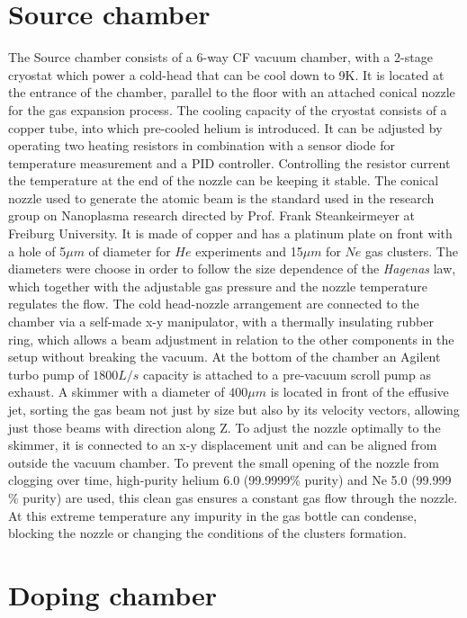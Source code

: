 \section{Source chamber}

The Source chamber consists of a 6-way CF vacuum chamber, with a 2-stage cryostat which power a cold-head that can be cool down to 9K. It is located at the entrance of the chamber, parallel to the floor with an attached conical nozzle for the gas expansion process. The cooling capacity of the cryostat consists of a copper tube, into which pre-cooled helium is introduced. It can be adjusted by operating two heating resistors in combination with a sensor diode for temperature measurement and a PID controller. Controlling the resistor current the temperature at the end of the nozzle can be keeping it stable. The conical nozzle used to generate the atomic beam is the standard used in the research group on Nanoplasma research directed by Prof. Frank Steankeirmeyer at Freiburg University.  It is made of copper and has a platinum plate on front with a hole of 5$\mu m$ of diameter for $He$ experiments and 15$\mu m$ for $Ne$ gas clusters. The diameters were choose in order to follow the size dependence of the \textit{Hagenas} law, which together with the adjustable gas pressure and the nozzle temperature regulates the flow.
The cold head-nozzle arrangement are connected to the chamber via a self-made x-y manipulator,  with a thermally insulating rubber ring, which allows a beam adjustment in relation to the other components in the setup without breaking the vacuum. At the bottom of the chamber an Agilent turbo pump of $1800 L/s$ capacity is attached to a pre-vacuum scroll pump as exhaust.
A skimmer with a diameter of $400\mu m$ is located in front of the effusive jet, sorting the gas beam not just by size but also by its velocity vectors, allowing just those beams with direction along Z. To adjust the nozzle optimally to the skimmer, it is connected to an x-y displacement unit and can be aligned from outside the vacuum chamber. To prevent the small opening of the nozzle from clogging over time, high-purity helium 6.0 (99.9999$\%$ purity) and Ne 5.0 (99.999$\%$ purity) are used, this clean gas ensures a constant gas flow through the nozzle. At this extreme temperature any impurity in the gas bottle can condense, blocking the nozzle or changing the conditions of the clusters formation. 

\section{Doping chamber}


